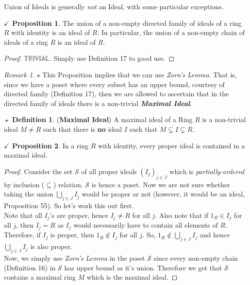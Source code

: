 \documentclass{article}
\theoremstyle{definition}
\newtheorem{definition}{$\boxed{\star}$ Definition}
\theoremstyle{remark}
\newtheorem*{remark}{Remark}
\theoremstyle{definition}
\theoremstyle{definition}
\newtheorem{proposition}{$\checkmark$ Proposition}
\theoremstyle{definition}
\theoremstyle{proof}
\begin{document}
Union of Ideals is generally \textit{not} an Ideal, with some particular exceptions.
\begin{proposition}
	The union of a non-empty directed family of ideals of a ring $ R$ with identity is an ideal of $ R $. In particular, the union of a non-empty chain of ideals of a ring $ R $ is an ideal of $ R $.
\end{proposition}
\begin{proof}
	$ \mathbb{TRIVIAL} $. Simply use Definition 17 to good use.
\end{proof}
\begin{remark}
	$ \star $ This Proposition implies that we can use \emph{Zorn's Lemma}. That is, since we have a poset where every subset has an upper bound, courtesy of directed family (Definition 17), then we are allowed to ascertain that in the directed family of ideals there is a non-trivial \textbf{\textit{Maximal Ideal}}.
\end{remark}
\hrulefill
\begin{definition}
	(\textbf{Maximal Ideal}) A maximal ideal of a Ring $R$ is a non-trivial ideal $ M \neq R $ such that there is \textbf{no} ideal $ I $ such that $ M\subsetneq I\subsetneq R $.
\end{definition}
\hrulefill
\begin{proposition}
	In a ring $ R $ with identity, every proper ideal is contained in a maximal ideal.
\end{proposition}
\begin{proof}
	Consider the set $ \mathcal{S} $ of all proper ideals $ (I_j)_{j\in J} $ which is \emph{partially-ordered} by inclusion ($ \subseteq $) relation. $ \mathcal{S} $ is hence a poset. Now we are not sure whether taking the union $ \bigcup_{j\in J}I_j $ would be proper or not (however, it would be an ideal, Proposition 55). So let's work this out first.\\
	 Note that all $ I_j $'s are proper, hence $ I_j \neq R $ for all $ j $. Also note that if $ 1_R\in I_j $ for all $ j $, then $ I_j = R $ as $ I_j $ would necessarily have to contain all elements of $ R $. Therefore, if $ I_j $ is proper, then $ 1_R \notin I_j $ for all $ j $. So, $1_R\notin \bigcup_{j\in J}I_j  $ and hence $ \bigcup_{j\in J}I_j $ is also proper. \\
	 Now, we simply use \emph{Zorn's Lemma} in the poset $ \mathcal{S} $ since every non-empty chain (Definition 16) in $ \mathcal{S} $ has upper bound as it's union. Therefore we get that $ \mathcal{S} $ contains a maximal ring $ M $ which is the maximal ideal. 
\end{proof}
\end{document}
